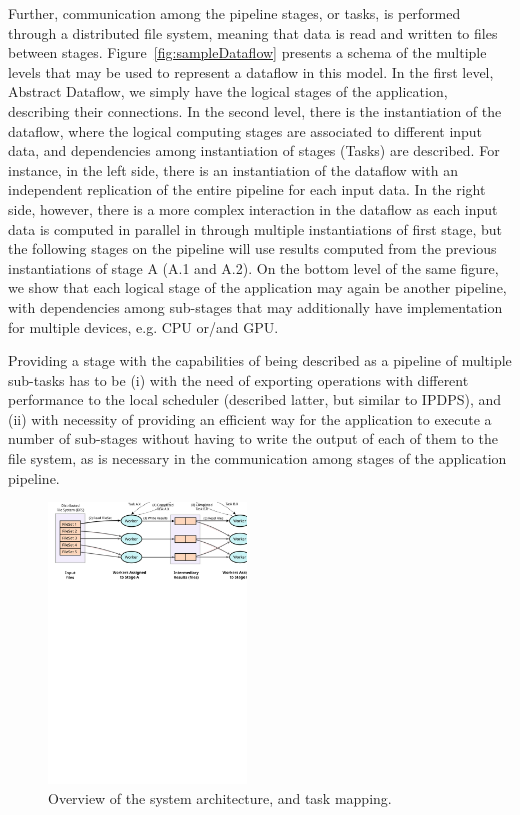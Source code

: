 Further, communication among the pipeline stages, or tasks, is performed
through a distributed file system, meaning that data is read and written to
files between stages. Figure~\ref{fig:sampleDataflow} presents a schema of the
multiple levels that may be used to represent a dataflow in this model. In the
first level, Abstract Dataflow, we simply have the logical stages of the
application, describing their connections. In the second level, there is the
instantiation of the dataflow, where the logical computing stages are
associated to different input data, and dependencies among instantiation of
stages (Tasks) are described. For instance, in the left side, there is an
instantiation of the dataflow with an independent replication of the entire
pipeline for each input data.  In the right side, however, there is a more
complex interaction in the dataflow as each input data is computed in parallel
in through multiple instantiations of first stage, but the following stages on
the pipeline will use results computed from the previous instantiations of
stage A (A.1 and A.2). On the bottom level of the same figure, we show that
each logical stage of the application may again be another pipeline, with
dependencies among sub-stages that may additionally have implementation for
multiple devices, e.g. CPU or/and GPU. 

Providing a stage with the capabilities of being described as a pipeline of
multiple sub-tasks has to be (i) with the need of exporting operations with
different performance to the local scheduler (described latter, but similar to
IPDPS), and (ii) with necessity of providing an efficient way for the
application to execute a number of sub-stages without having to write the
output of each of them to the file system, as is necessary in the
communication among stages of the application pipeline.



\begin{figure}[ht]
\begin{center}
\includegraphics[width=0.47\textwidth]{images/executionModel}
\caption{Overview of the system architecture, and task mapping.}
\label{fig:execModel}
\end{center}
\end{figure}

